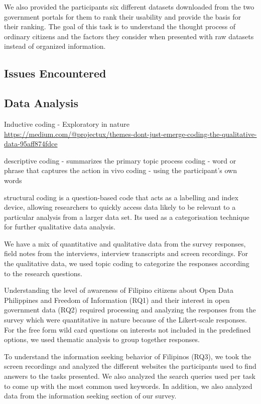 \documentclass{sigchi}
\begin{document}
We also provided the participants six different datasets downloaded from the two government portals for them to rank their usability and provide the basis for their ranking. The goal of this task is to understand the thought process of ordinary citizens and the factors they consider when presented with raw datasets instead of organized information. 

\subsection{Issues  Encountered}

\subsection{Data Analysis}
Inductive coding - Exploratory in nature
\url{https://medium.com/@projectux/themes-dont-just-emerge-coding-the-qualitative-data-95aff874fdce}

descriptive coding - summarizes the primary topic
process coding - word or phrase that captures the action
in vivo coding - using the participant's own words

structural coding is a question-based code that acts as a labelling and index device, allowing researchers to quickly access data likely to be relevant to a particular analysis from a larger data set. Its used as a categorisation technique for further qualitative data analysis.

We have a mix of quantitative and qualitative data from the survey responses, field notes from the interviews, interview transcripts and screen recordings. For the qualitative data, we used topic coding to categorize the responses according to the research questions.

Understanding the level of awareness of Filipino citizens about Open Data Philippines and Freedom of Information (RQ1) and their interest in open government data (RQ2) required processing and analyzing the responses from the survey which were quantitative in nature because of the Likert-scale responses. For the free form wild card questions on interests not included in the predefined options, we used thematic analysis to group together responses.

To understand the information seeking behavior of Filipinos (RQ3), we took the screen recordings and analyzed the different websites the participants used to find answers to the tasks presented. We also analyzed the search queries used per task to come up with the most common used keywords. In addition, we also analyzed data from the information seeking section of our survey.
\end{document}
